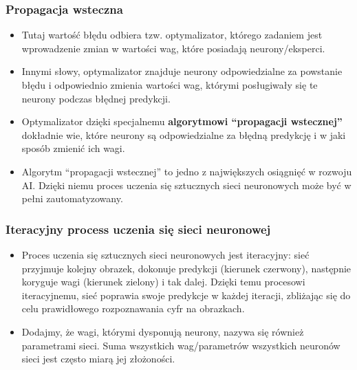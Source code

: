 \documentclass{beamer}
\begin{document}
\begin{frame}[fragile]
\frametitle{Propagacja wsteczna}
\begin{itemize}
\item Tutaj wartość błędu odbiera tzw. optymalizator, którego zadaniem jest wprowadzenie zmian w wartości wag, które posiadają neurony/eksperci.
\item Innymi słowy, optymalizator znajduje neurony odpowiedzialne za powstanie błędu i odpowiednio zmienia wartości wag, którymi posługiwały się te neurony podczas błędnej predykcji. 
\item Optymalizator dzięki specjalnemu \textbf{algorytmowi “propagacji wstecznej”} dokładnie wie, które neurony są odpowiedzialne za błędną predykcję i w jaki sposób zmienić ich wagi. 
\item Algorytm “propagacji wstecznej” to jedno z największych osiągnięć w rozwoju AI. Dzięki niemu proces uczenia się sztucznych sieci neuronowych może być w pełni zautomatyzowany. 
\end{itemize}
\end{frame}

\begin{frame}[fragile]
\frametitle{Iteracyjny process uczenia się sieci neuronowej}
\begin{itemize}
\item Proces uczenia się sztucznych sieci neuronowych jest iteracyjny: sieć przyjmuje kolejny obrazek, dokonuje predykcji (kierunek czerwony), następnie koryguje wagi (kierunek zielony) i tak dalej. Dzięki temu procesowi iteracyjnemu, sieć poprawia swoje predykcje w każdej iteracji, zbliżając się do celu prawidłowego rozpoznawania cyfr na obrazkach.
\item Dodajmy, że wagi, którymi dysponują neurony, nazywa się również parametrami sieci. Suma wszystkich wag/parametrów wszystkich neuronów sieci jest często miarą jej złożoności. 
\end{itemize}
\end{frame}
\end{document}
